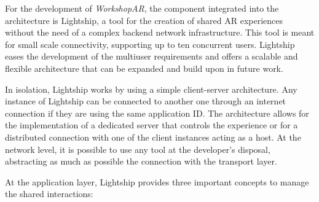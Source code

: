 For the development of \emph{WorkshopAR}, the component integrated into the architecture is Lightship, a tool for the creation of shared \ac{AR} experiences without the
need of a complex backend network infrastructure. This tool is meant for small scale connectivity, supporting up to ten concurrent users. Lightship eases the development
of the multiuser requirements and offers a scalable and flexible architecture that can be expanded and build upon in future work.

In isolation, Lightship works by using a simple client-server architecture. Any instance of Lightship can be connected to another one through an internet connection if
they are using the same application ID. The architecture allows for the implementation of a dedicated server that controls the experience or for a distributed connection
with one of the client instances acting as a host. At the network level, it is possible to use any tool at the developer's disposal, abstracting as much as possible the
connection with the transport layer.

At the application layer, Lightship provides three important concepts to manage the shared interactions:

